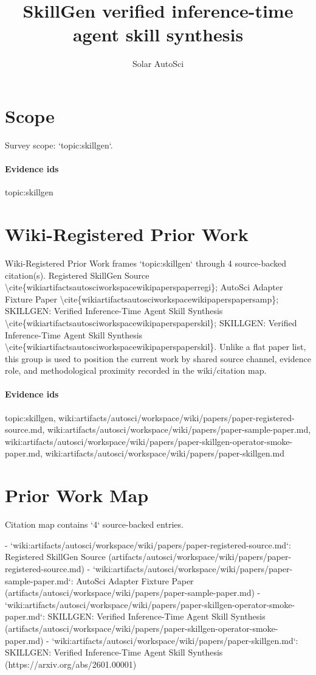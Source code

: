 \documentclass{article}
\title{SkillGen verified inference-time agent skill synthesis}
\author{Solar AutoSci}
\date{}
\begin{document}
\maketitle

\section{Scope}
Survey scope: `topic:skillgen`.

\paragraph{Evidence ids} topic:skillgen

\section{Wiki-Registered Prior Work}
Wiki-Registered Prior Work frames `topic:skillgen` through 4 source-backed citation(s). Registered SkillGen Source \textbackslash{}cite\{wikiartifactsautosciworkspacewikipaperspaperregi\}; AutoSci Adapter Fixture Paper \textbackslash{}cite\{wikiartifactsautosciworkspacewikipaperspapersamp\}; SKILLGEN: Verified Inference-Time Agent Skill Synthesis \textbackslash{}cite\{wikiartifactsautosciworkspacewikipaperspaperskil\}; SKILLGEN: Verified Inference-Time Agent Skill Synthesis \textbackslash{}cite\{wikiartifactsautosciworkspacewikipaperspaperskil\}. Unlike a flat paper list, this group is used to position the current work by shared source channel, evidence role, and methodological proximity recorded in the wiki/citation map.

\paragraph{Evidence ids} topic:skillgen, wiki:artifacts/autosci/workspace/wiki/papers/paper-registered-source.md, wiki:artifacts/autosci/workspace/wiki/papers/paper-sample-paper.md, wiki:artifacts/autosci/workspace/wiki/papers/paper-skillgen-operator-smoke-paper.md, wiki:artifacts/autosci/workspace/wiki/papers/paper-skillgen.md

\section{Prior Work Map}
Citation map contains `4` source-backed entries.

- `wiki:artifacts/autosci/workspace/wiki/papers/paper-registered-source.md`: Registered SkillGen Source (artifacts/autosci/workspace/wiki/papers/paper-registered-source.md)
- `wiki:artifacts/autosci/workspace/wiki/papers/paper-sample-paper.md`: AutoSci Adapter Fixture Paper (artifacts/autosci/workspace/wiki/papers/paper-sample-paper.md)
- `wiki:artifacts/autosci/workspace/wiki/papers/paper-skillgen-operator-smoke-paper.md`: SKILLGEN: Verified Inference-Time Agent Skill Synthesis (artifacts/autosci/workspace/wiki/papers/paper-skillgen-operator-smoke-paper.md)
- `wiki:artifacts/autosci/workspace/wiki/papers/paper-skillgen.md`: SKILLGEN: Verified Inference-Time Agent Skill Synthesis (https://arxiv.org/abs/2601.00001)
\end{document}
